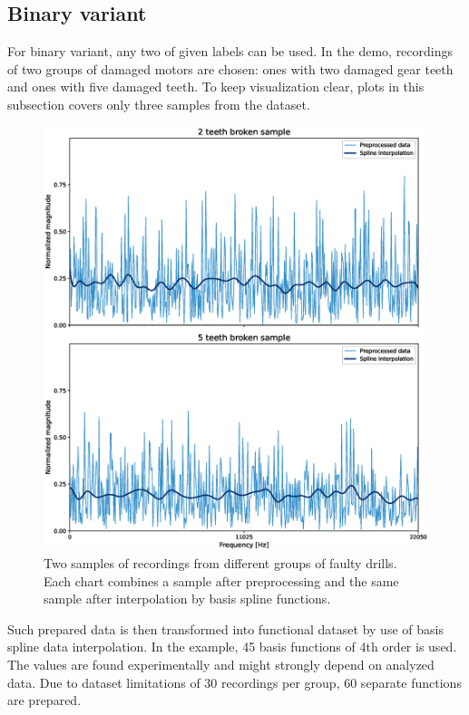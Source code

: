 \documentclass[energies,article,submit,pdftex,moreauthors]{Definitions/mdpi}
\begin{document}
\subsection{Binary variant}

For binary variant, any two of given labels can be used. In the demo, recordings of two groups of damaged motors are chosen: ones with two damaged gear teeth and ones with five damaged teeth. To keep visualization clear, plots in this subsection covers only three samples from the dataset.

\begin{figure}[H]
\includegraphics[width=\textwidth]{images/combined_data_with_splines}
\caption{Two samples of recordings from different groups of faulty drills. Each chart combines a sample after preprocessing and the same sample after interpolation by basis spline functions.}
\end{figure}
\unskip
\vspace{5mm}

Such prepared data is then transformed into functional dataset by use of basis spline data interpolation. In the example, 45 basis functions of 4th order is used. The values are found experimentally and might strongly depend on analyzed data. Due to dataset limitations of 30 recordings per group, 60 separate functions are prepared.
\end{document}
